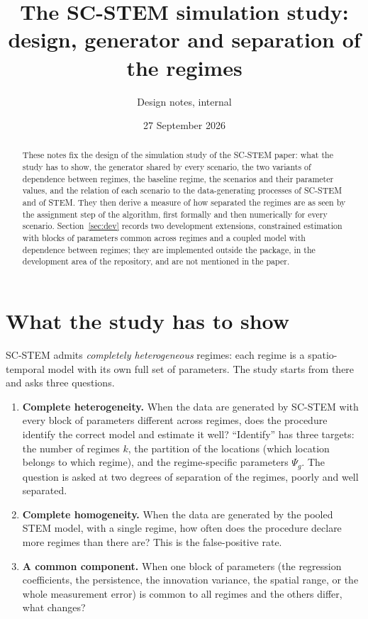 \documentclass[11pt]{article}
\title{The SC-STEM simulation study:\\ design, generator and separation of the regimes}
\author{Design notes, internal}
\date{27 September 2026}
\begin{document}
\maketitle

\begin{abstract}
\noindent These notes fix the design of the simulation study of the SC-STEM paper: what the study has to show, the generator shared by every scenario, the two variants of dependence between regimes, the baseline regime, the scenarios and their parameter values, and the relation of each scenario to the data-generating processes of SC-STEM and of STEM. They then derive a measure of how separated the regimes are as seen by the assignment step of the algorithm, first formally and then numerically for every scenario. Section~\ref{sec:dev} records two development extensions, constrained estimation with blocks of parameters common across regimes and a coupled model with dependence between regimes; they are implemented outside the package, in the development area of the repository, and are not mentioned in the paper.
\end{abstract}

\tableofcontents

\section{What the study has to show}\label{sec:aims}

SC-STEM admits \emph{completely heterogeneous} regimes: each regime is a spatio-temporal model with its own full set of parameters. The study starts from there and asks three questions.

\begin{enumerate}[leftmargin=2em]
  \item \textbf{Complete heterogeneity.} When the data are generated by SC-STEM with every block of parameters different across regimes, does the procedure identify the correct model and estimate it well? ``Identify'' has three targets: the number of regimes $k$, the partition of the locations (which location belongs to which regime), and the regime-specific parameters $\Psi_g$. The question is asked at two degrees of separation of the regimes, poorly and well separated.
  \item \textbf{Complete homogeneity.} When the data are generated by the pooled STEM model, with a single regime, how often does the procedure declare more regimes than there are? This is the false-positive rate.
  \item \textbf{A common component.} When one block of parameters (the regression coefficients, the persistence, the innovation variance, the spatial range, or the whole measurement error) is common to all regimes and the others differ, what changes?
\end{enumerate}
\end{document}
